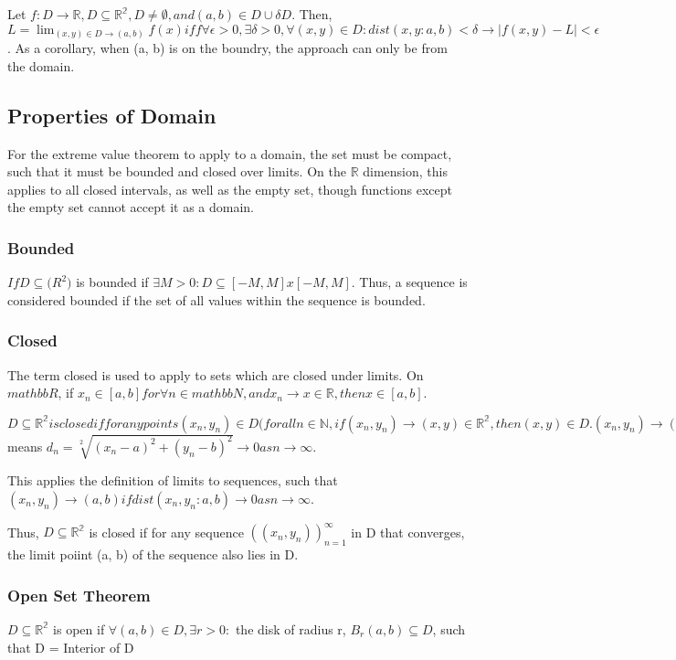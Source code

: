 Let $f: D \to \mathbb{R}, D \subseteq \mathbb{R^2}, D \neq \emptyset, and (a, b) \in D \cup \delta D.$ Then, $L = \lim_{(x, y) \in D \to (a,b)} f(x) iff \forall \epsilon > 0, \exists \delta > 0, \forall (x, y) \in D: dist(x, y: a, b) < \delta \to |f(x, y) - L| < \epsilon$. As a corollary, when (a, b) is on the boundry, the approach can only be from the domain.

\subsection{Properties of Domain}
For the extreme value theorem to apply to a domain, the set must be compact, such that it must be bounded and closed over limits. On the $\mathbb{R}$ dimension, this applies to all closed intervals, as well as the empty set, though functions except the empty set cannot accept it as a domain.

\subsubsection{Bounded}
$If D \subseteq \mathbb(R^2)$ is bounded if $\exists M > 0: D \subseteq [-M, M] x [-M, M]$. Thus, a sequence is considered bounded if the set of all values within the sequence is bounded.

\subsubsection{Closed}
The term closed is used to apply to sets which are closed under limits. On $mathbb{R}$, if $x_n \in [a, b] for \forall n \in mathbb{N}, and x_n \to x \in \mathbb{R}, then x \in [a, b]$.

$D \subseteq \mathbb{R^2} is closed if for any points (x_n, y_n) \in D (for all n \in \mathbb{N}, if (x_n, y_n) \to (x, y) \in \mathbb{R^2}, then (x, y) \in D. (x_n, y_n) \to (a, b) as n \to \infty$ means $d_n = \sqrt[2]{(x_n - a)^2 + (y_n - b)^2} \to 0 as n \to \infty.$

This applies the definition of limits to sequences, such that $(x_n, y_n) \to (a, b) if dist(x_n, y_n: a, b) \to 0 as n \to \infty$.

Thus, $D \subseteq \mathbb{R^2}$ is closed if for any sequence $((x_n, y_n))^\infty_{n=1}$ in D that converges, the limit poiint (a, b) of the sequence also lies in D.

\subsubsection{Open Set Theorem}
$D \subseteq \mathbb{R^2}$ is open if $\forall (a, b) \in D, \exists r > 0:$ the disk of radius r, $B_r(a, b) \subseteq D$, such that D = Interior of D

